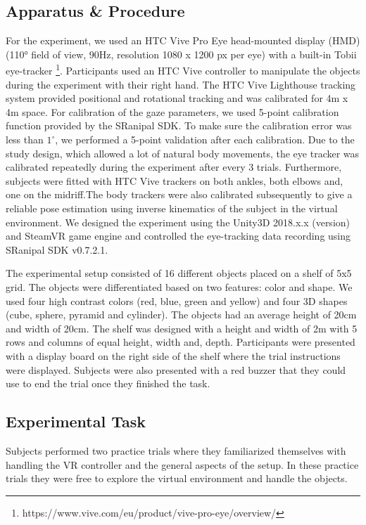 \subsection{Apparatus \& Procedure}
For the experiment, we used an HTC Vive Pro Eye head-mounted display (HMD)(110° field of view, 90Hz, resolution 1080 x 1200 px per eye) with a built-in Tobii eye-tracker \footnote{https://www.vive.com/eu/product/vive-pro-eye/overview/}. Participants used an HTC Vive controller to manipulate the objects during the experiment with their right hand. The HTC Vive Lighthouse tracking system provided positional and rotational tracking and was calibrated for 4m x 4m space. For calibration of the gaze parameters, we used 5-point calibration function provided by the SRanipal SDK. To make sure the calibration error was less than $1^\circ$, we performed a 5-point validation after each calibration. Due to the study design, which allowed a lot of natural body movements, the eye tracker was calibrated repeatedly during the experiment after every 3 trials. Furthermore, subjects were fitted with HTC Vive trackers on both ankles, both elbows and, one on the midriff.The body trackers were also calibrated subsequently to give a reliable pose estimation using inverse kinematics of the subject in the virtual environment. We designed the experiment using the Unity3D 2018.x.x (version) and SteamVR game engine and controlled the eye-tracking data recording using SRanipal SDK v0.7.2.1. 

The experimental setup consisted of 16 different objects placed on a shelf of 5x5 grid. The objects were differentiated based on two features: color and shape. We used four high contrast colors (red, blue, green and yellow) and four 3D shapes (cube, sphere, pyramid and cylinder). The objects had an average height of 20cm and width of 20cm. The shelf was designed with a height and width of 2m with 5 rows and columns of equal height, width and, depth. Participants were presented with a display board on the right side of the shelf where the trial instructions were displayed. Subjects were also presented with a red buzzer that they could use to end the trial once they finished the task. 

\subsection{Experimental Task}
Subjects performed two practice trials where they familiarized themselves with handling the VR controller and the general aspects of the setup. In these practice trials they were free to explore the virtual environment and handle the objects. 

